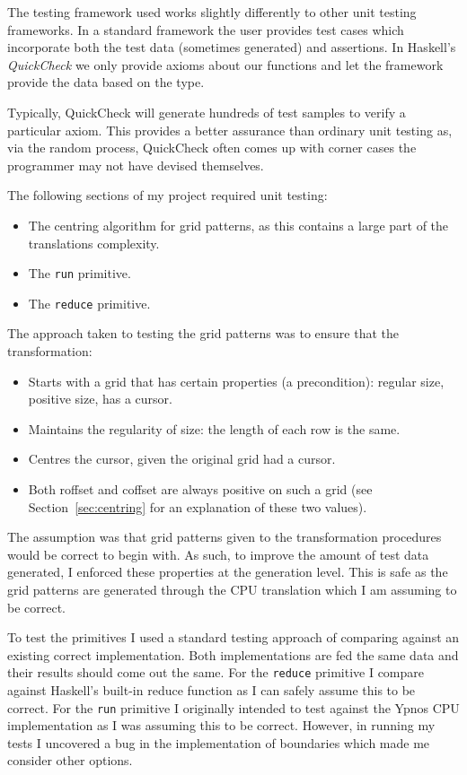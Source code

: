 \documentclass[12pt,a4paper,twoside]{scrbook}
\begin{document}
The testing framework used works slightly differently to other unit testing
frameworks. In a standard framework the user provides test cases which
incorporate both the test data (sometimes generated) and assertions. In
Haskell's \emph{QuickCheck} we only provide axioms about our functions and let
the framework provide the data based on the type.

Typically, QuickCheck will generate hundreds of test samples to verify a
particular axiom. This provides a better assurance than ordinary unit
testing as, via the random process, QuickCheck often comes up with corner
cases the programmer may not have devised themselves.

The following sections of my project required unit testing:

\begin{itemize}
\item
  The centring algorithm for grid patterns, as this contains a large
  part of the translations complexity.
\item
  The \texttt{run} primitive.
\item
  The \texttt{reduce} primitive.
\end{itemize}

The approach taken to testing the grid patterns was to ensure that the
transformation:

\begin{itemize}
\item
  Starts with a grid that has certain properties (a precondition):
  regular size, positive size, has a cursor.
\item
  Maintains the regularity of size: the length of each row is the same.
\item
  Centres the cursor, given the original grid had a cursor.
\item
  Both roffset and coffset are always positive on such a grid (see
  Section~\ref{sec:centring} for an explanation of these two values).
\end{itemize}

The assumption was that grid patterns given to the transformation procedures
would be correct to begin with. As such, to improve the amount of test data
generated, I enforced these properties at the generation level. This is safe as
the grid patterns are generated through the CPU translation which I am assuming
to be correct.

To test the primitives I used a standard testing approach of comparing against
an existing correct implementation. Both implementations are fed the same data
and their results should come out the same. For the \texttt{reduce} primitive I
compare against Haskell's built-in reduce function as I can safely assume this
to be correct. For the \texttt{run} primitive I originally intended to test
against the Ypnos CPU implementation as I was assuming this to be
correct. However, in running my tests I uncovered a bug in the implementation of
boundaries which made me consider other options.
\end{document}
